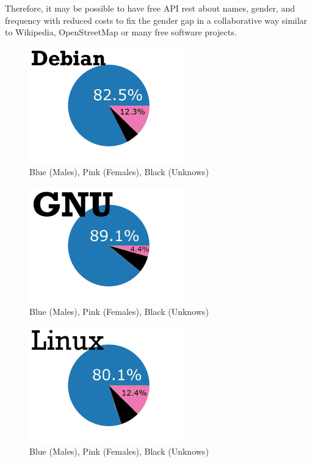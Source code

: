 \documentclass[a4paper]{article}
\begin{document}
Therefore, it may be possible to have free API rest about names,
gender, and frequency with reduced costs to fix the gender gap
in a collaborative way similar to Wikipedia, OpenStreetMap or
many free software projects.

\begin{figure}
  \centering
  \includegraphics[width=0.6\textwidth]{images/debian.gender.pretty.pdf}
  \caption[Caption for LOF]{Blue (Males), Pink (Females), Black (Unknows)}
  \label{fig:debian}
\end{figure}

\begin{figure}
  \centering
  \includegraphics[width=0.6\textwidth]{images/gnu.gender.pretty.pdf}
  \caption[Caption for LOF]{Blue (Males), Pink (Females), Black (Unknows)}
  \label{fig:gnu}
\end{figure}


\begin{figure}
  \centering
  \includegraphics[width=0.6\textwidth]{images/linux.gender.pretty.pdf}
  \caption[Caption for LOF]{Blue (Males), Pink (Females), Black (Unknows)}
  \label{fig:linux}  
\end{figure}
\end{document}
